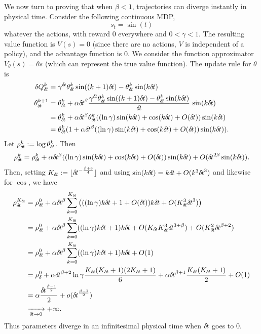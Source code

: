 We now turn to proving that when $\beta < 1$,
trajectories can diverge instantly in physical time. 
Consider the following continuous MDP, 
\begin{equation}
	s_t = \sin(t)
\end{equation}
whatever the actions,
with reward $0$ everywhere and $0 < \gamma < 1$.
The resulting value function is $V(s) = 0$ (since there
are no actions, $V$ is independent of a policy), and the advantage
function is $0$.
We consider the function approximator $V_\theta(s) = \theta s$ (which can
represent the true value function).
The update rule for $\theta$ is
\begin{align}
\delta Q_\deltat^k &= \gamma^\deltat \theta_\deltat^k \sin((k + 1)
\deltat) - \theta_\deltat^k \sin(k\deltat)\\
	\theta_\deltat^{k+1} &= \theta_\deltat^k + \alpha \deltat^\beta
	\frac{\gamma^\deltat \theta_\deltat^k \sin((k + 1) \deltat) -
	\theta_\deltat^k \sin(k\deltat)}{\deltat}\,\sin(k\deltat)\\
			     &= \theta_\deltat^k + \alpha \deltat^\beta
			     \theta_\deltat^k
			     ((\ln \gamma) \sin(k \deltat)
			     + \cos(k
			     \deltat)+\bigO(\deltat))\sin(k\deltat)\\
			     &= \theta_\deltat^k(1 + \alpha \deltat^\beta
			     ((\ln \gamma) \sin(k \deltat) + \cos(k
			     \deltat)+\bigO(\deltat))\sin(k\deltat)).
\end{align}
Let $\rho_{\delta\hspace{-.1em}t}^k \mathrel{\mathop{:}}= \log \theta_{\delta\hspace{-.1em}t}^k$. Then
\begin{align}
	\rho_{\delta\hspace{-.1em}t}^k = \rho_{\delta\hspace{-.1em}t}^k + \alpha {\delta\hspace{-.1em}t}^\beta ((\ln
	\gamma) \sin(k {\delta\hspace{-.1em}t}) + \cos(k
	{\delta\hspace{-.1em}t})+O({\delta\hspace{-.1em}t}))\sin(k{\delta\hspace{-.1em}t})+O({\delta\hspace{-.1em}t}^{2\beta}\sin(k{\delta\hspace{-.1em}t})).
\end{align}
Then, setting $K_{\delta\hspace{-.1em}t} \mathrel{\mathop{:}}= \lfloor {\delta\hspace{-.1em}t}^{-\frac{\beta +
3}{4}}\rfloor$ and using $\sin(k{\delta\hspace{-.1em}t})=k{\delta\hspace{-.1em}t}+O(k^3{\delta\hspace{-.1em}t}^3)$ and
likewise for $\cos$, we have
\begin{align}
	\rho_\deltat^{K_\deltat} &= \rho_\deltat^0 + \alpha \deltat^\beta
	\sum\limits_{k=0}^{K_\deltat} \left(((\ln \gamma)k\deltat +
	1+O(\deltat))k\deltat + \bigO(K_\deltat^3 \deltat^{3})\right)\\
	&= \rho_\deltat^0 + \alpha \deltat^\beta
	\sum\limits_{k=0}^{K_\deltat} ((\ln \gamma) k\deltat +
	1)k\deltat + \bigO(K_\deltat K_\deltat^3 \deltat^{3 + \beta}) +
	\bigO(K_\deltat^2 \deltat^{\beta+2})\\
				 &= \rho_\deltat^0 + \alpha \deltat^\beta
				 \sum\limits_{k=0}^{K_\deltat} ((\ln
				 \gamma) k\deltat + 1)k\deltat +
				 \bigO(1)\\
				 &= \rho_\delta^0 + \alpha\deltat^{\beta
				 + 2} \ln\gamma \frac{K_\deltat
				 (K_\deltat + 1) (2 K_\deltat + 1)}{6} +
				 \alpha \deltat^{\beta + 1}
				 \frac{K_\deltat (K_\deltat + 1)}{2} +
				 O(1)\\
				 &= \alpha \frac{\deltat^{\frac{\beta - 1}{2}}}{2} + \smallo(\deltat^{\frac{\beta - 1}{2}})\\
				 &\xrightarrow[\deltat\to 0]{} +\infty.
\end{align}
Thus parameters diverge in an infinitesimal physical time when ${\delta\hspace{-.1em}t}$ goes to $0$.


